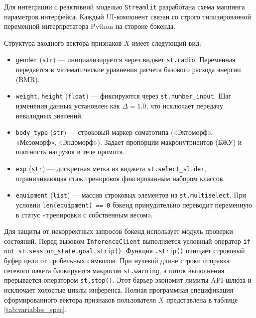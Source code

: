 \documentclass[14pt, a4paper]{extarticle}
\begin{document}
Для интеграции с реактивной моделью \texttt{Streamlit}\cite{streamlit_doc} разработана схема маппинга параметров интерфейса. Каждый UI-компонент связан со строго типизированной переменной интерпретатора Python на стороне бэкенда.

Структура входного вектора признаков $X$ имеет следующий вид:
\begin{itemize}
    \item \texttt{gender} (\texttt{str}) --- инициализируется через виджет \texttt{st.radio}. Переменная передается в математические уравнения расчета базового расхода энергии (BMR).
    \item \texttt{weight}, \texttt{height} (\texttt{float}) --- фиксируются через \texttt{st.number\_input}. Шаг изменения данных установлен как $\Delta = 1.0$, что исключает передачу невалидных значений.
    \item \texttt{body\_type} (\texttt{str}) --- строковый маркер соматотипа («Эктоморф», «Мезоморф», «Эндоморф»). Задает пропорции макронутриентов (БЖУ) и плотность нагрузок в теле промпта.
    \item \texttt{exp} (\texttt{str}) --- дискретная метка из виджета \texttt{st.select\_slider}, ограничивающая стаж тренировок фиксированным набором классов.
    \item \texttt{equipment} (\texttt{list}) --- массив строковых элементов из \texttt{st.multiselect}. При условии \texttt{len(equipment) == 0} бэкенд принудительно переводит переменную в статус «тренировки с собственным весом».
\end{itemize}

Для защиты от некорректных запросов бэкенд использует модуль проверки состояний. Перед вызовом \texttt{InferenceClient} выполняется условный оператор \texttt{if not st.session\_state.goal.strip()}. Функция \texttt{.strip()} очищает строковый буфер цели от пробельных символов. При нулевой длине строки отправка сетевого пакета блокируется макросом \texttt{st.warning}, а поток выполнения прерывается оператором \texttt{st.stop()}. Этот барьер экономит лимиты API-шлюза и исключает холостые циклы инференса. Полная программная спецификация сформированного вектора признаков пользователя $X$ представлена в таблице \ref{tab:variables_spec}.
\end{document}
